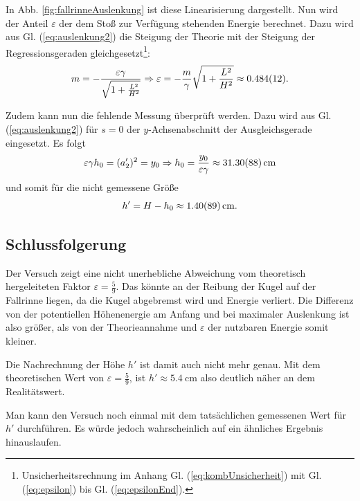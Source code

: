 	In Abb. \ref{fig:fallrinneAuslenkung} ist diese Linearisierung dargestellt.
	Nun wird der Anteil $\varepsilon$ der dem Stoß zur Verfügung stehenden Energie berechnet.
	Dazu wird aus Gl. (\ref{eq:auslenkung2}) die Steigung der Theorie mit der Steigung der Regressionsgeraden gleichgesetzt\footnote{Unsicherheitsrechnung im Anhang Gl. (\ref{eq:kombUnsicherheit}) mit Gl. (\ref{eq:epsilon}) bis Gl. (\ref{eq:epsilonEnd}).}:
	\begin{equation}
		m = -\frac{\varepsilon \gamma}{\sqrt{1 + \frac{L^2}{H^2}}} \Rightarrow \varepsilon = -\frac{m}{\gamma} \sqrt{1+\frac{L^2}{H^2}} \approx \SI{0,484 +- 0,012}{}.
	\end{equation}
	
	Zudem kann nun die fehlende Messung überprüft werden.
	Dazu wird aus Gl. (\ref{eq:auslenkung2}) für $s = 0$ der $y$-Achsenabschnitt der Ausgleichsgerade eingesetzt.
	Es folgt
	\begin{equation}
		\varepsilon \gamma h_0 = (a'_2)^2= y_0 \Rightarrow h_0 = \frac{y_0}{\varepsilon\gamma} \approx \SI{31,30 +- 0,88}{\centi\meter}
	\end{equation}
	und somit für die nicht gemessene Größe
	\begin{equation}
		h' = H - h_0 \approx \SI{1,40 +- 0,89}{\centi\meter}.
	\end{equation}
	
	\subsection{Schlussfolgerung}
	
	Der Versuch zeigt eine nicht unerhebliche Abweichung vom theoretisch hergeleiteten Faktor $\varepsilon = \frac{5}{9}$.
	Das könnte an der Reibung der Kugel auf der Fallrinne liegen, da die Kugel abgebremst wird und Energie verliert.
	Die Differenz von der potentiellen Höhenenergie am Anfang und bei maximaler Auslenkung ist also größer, als von der Theorieannahme und $\varepsilon$ der nutzbaren Energie somit kleiner.
	
	Die Nachrechnung der Höhe $h'$ ist damit auch nicht mehr genau.
	Mit dem theoretischen Wert von $\varepsilon = \frac{5}{9}$, ist $h' \approx \SI{5,4}{\centi\meter}$ also deutlich näher an dem Realitätswert.
	
	Man kann den Versuch noch einmal mit dem tatsächlichen gemessenen Wert für $h'$ durchführen.
	Es würde jedoch wahrscheinlich auf ein ähnliches Ergebnis hinauslaufen.
	